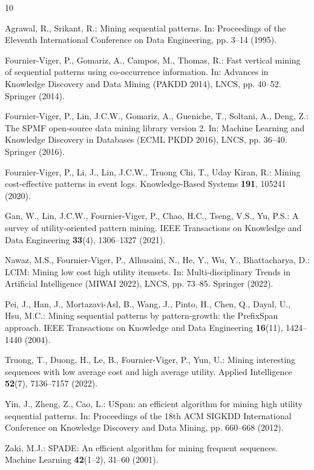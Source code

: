 \documentclass[runningheads]{llncs}
\begin{document}
\begin{thebibliography}{10}

Agrawal, R., Srikant, R.: Mining sequential patterns. In: Proceedings of the Eleventh
International Conference on Data Engineering, pp. 3--14 (1995).

Fournier-Viger, P., Gomariz, A., Campos, M., Thomas, R.: Fast vertical mining of sequential
patterns using co-occurrence information. In: Advances in Knowledge Discovery and Data Mining
(PAKDD 2014), LNCS, pp. 40--52. Springer (2014). 

Fournier-Viger, P., Lin, J.C.W., Gomariz, A., Gueniche, T., Soltani, A., Deng, Z.: The SPMF
open-source data mining library version 2. In: Machine Learning and Knowledge Discovery in
Databases (ECML PKDD 2016), LNCS, pp. 36--40. Springer (2016).

Fournier-Viger, P., Li, J., Lin, J.C.W., Truong Chi, T., Uday Kiran, R.: Mining cost-effective
patterns in event logs. Knowledge-Based Systems \textbf{191}, 105241 (2020).

Gan, W., Lin, J.C.W., Fournier-Viger, P., Chao, H.C., Tseng, V.S., Yu, P.S.: A survey of
utility-oriented pattern mining. IEEE Transactions on Knowledge and Data Engineering
\textbf{33}(4), 1306--1327 (2021). 

Nawaz, M.S., Fournier-Viger, P., Alhusaini, N., He, Y., Wu, Y., Bhattacharya, D.: LCIM:
Mining low cost high utility itemsets. In: Multi-disciplinary Trends in Artificial
Intelligence (MIWAI 2022), LNCS, pp. 73--85. Springer (2022).

Pei, J., Han, J., Mortazavi-Asl, B., Wang, J., Pinto, H., Chen, Q., Dayal, U., Hsu, M.C.:
Mining sequential patterns by pattern-growth: the PrefixSpan approach. IEEE Transactions on
Knowledge and Data Engineering \textbf{16}(11), 1424--1440 (2004).

Truong, T., Duong, H., Le, B., Fournier-Viger, P., Yun, U.: Mining interesting sequences with
low average cost and high average utility. Applied Intelligence \textbf{52}(7), 7136--7157
(2022). 

Yin, J., Zheng, Z., Cao, L.: USpan: an efficient algorithm for mining high utility sequential
patterns. In: Proceedings of the 18th ACM SIGKDD International Conference on Knowledge
Discovery and Data Mining, pp. 660--668 (2012). 

Zaki, M.J.: SPADE: An efficient algorithm for mining frequent sequences. Machine Learning
\textbf{42}(1--2), 31--60 (2001). 

\end{thebibliography}
\end{document}
